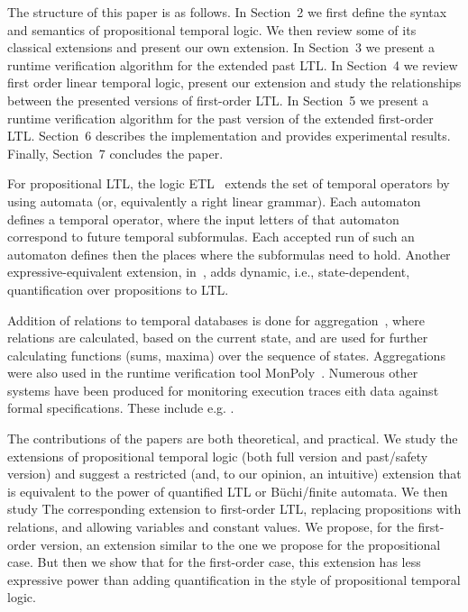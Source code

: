 The structure of this paper is as follows. In Section~2 we first define the syntax and semantics of propositional temporal logic. We then review some of its classical extensions and present our own extension. In Section~3 we present a runtime verification algorithm for the extended past LTL. In Section~4 we review first order linear temporal logic, present our extension and study the relationships between the presented versions of first-order LTL. In Section~5 we present a runtime verification algorithm for the past version of the extended first-order LTL. Section~6 describes the implementation and provides experimental results. Finally, Section~7 concludes the paper.


\vspace{1ex}
For propositional LTL, the logic ETL~\cite{Wolper,WVS} extends
the set of temporal operators 
by using automata (or, equivalently a right linear grammar). Each automaton defines a temporal operator, where the input letters of that automaton correspond to future temporal subformulas. Each accepted run of such an automaton defines then the places
where the subformulas need to hold. Another expressive-equivalent extension, 
in~\cite{Wolper}, adds dynamic, i.e.,
state-dependent, quantification over propositions to LTL.

Addition of relations to temporal databases is done
for aggregation~\cite{Libkin}, where relations are
calculated, based on the current state, and are used for further calculating
functions (sums, maxima) over the sequence of states. Aggregations were also used in the runtime verification tool 
{\sf MonPoly}~\cite{agrebasin}.
%
%
Numerous other systems have been produced for monitoring
execution traces eith data against formal specifications. 
These include e.g. \cite{LOLA,larva,halle-beepbeep-ieee-12,Meredith2011,Reger2015}. 


\iffalse
The contributions of the papers are both theoretical, and
practical. We study the extensions of propositional temporal logic (both full version and past/safety version) and suggest a restricted (and, to our opinion, an intuitive) extension that is equivalent to the power of quantified LTL or B\"{u}chi/finite automata. We then study 
The corresponding extension to first-order LTL, replacing propositions with relations, and allowing variables and constant values. We propose, for the first-order version, an extension similar to the one we propose for the propositional case. But then we show that for the first-order case, this extension has
less expressive power than adding quantification in the style of propositional temporal logic.

